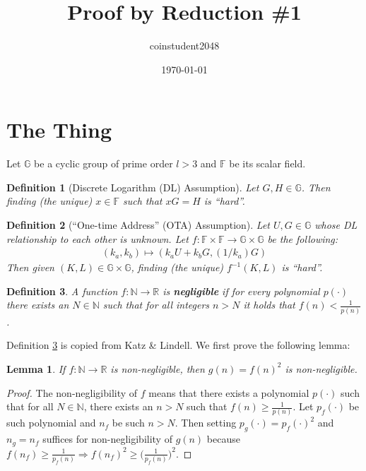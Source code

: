 \documentclass{article}
\title{Proof by Reduction \#1}
\author{coinstudent2048}
\date{\today}
\newtheorem{definition}{Definition}[section]
\newtheorem{lemma}[theorem]{Lemma}
\begin{document}
\maketitle


\section{The Thing}
\noindent Let $\mathbb{G}$ be a cyclic group of prime order $l>3$ and $\mathbb{F}$ be its scalar field.

\begin{definition}[Discrete Logarithm (DL) Assumption]
Let $G, H\in\mathbb{G}$. Then finding (the unique) $x\in\mathbb{F}$ such that $xG=H$ is ``hard''.
\end{definition}

\begin{definition}[``One-time Address'' (OTA) Assumption]
Let $U, G\in\mathbb{G}$ whose DL relationship to each other is unknown. Let $f:\mathbb{F}\times\mathbb{F}\rightarrow\mathbb{G}\times\mathbb{G}$ be the following:
\begin{align*}
    (k_a, k_b) \mapsto (k_a U + k_b G, (1/k_a)G)
\end{align*}
Then given $(K, L)\in\mathbb{G}\times\mathbb{G}$, finding (the unique) $f^{-1}(K,L)$ is ``hard''.
\end{definition}

\begin{definition}\label{negl}
A function $f:\mathbb{N}\rightarrow\mathbb{R}$ is \textbf{\em negligible} if for every polynomial $p(\cdot)$ there exists an $N\in\mathbb{N}$ such that for all integers $n>N$ it holds that $f(n)<\frac{1}{p(n)}$.
\end{definition}

\noindent Definition \ref{negl} is copied from Katz \& Lindell. We first prove the following lemma:

\begin{lemma}\label{square}
If $f:\mathbb{N}\rightarrow\mathbb{R}$ is non-negligible, then $g(n)=f(n)^2$ is non-negligible.
\end{lemma}
\begin{proof}
The non-negligibility of $f$ means that there exists a polynomial $p(\cdot)$ such that for all $N\in\mathbb{N}$, there exists an $n>N$ such that $f(n)\ge\frac{1}{p(n)}$. Let $p_f(\cdot)$ be such polynomial and $n_f$ be such $n>N$. Then setting $p_g(\cdot)=p_f(\cdot)^2$ and $n_g=n_f$ suffices for non-negligibility of $g(n)$ because $f(n_f)\ge\frac{1}{p_f(n)}\Rightarrow f(n_f)^2\ge\big(\frac{1}{p_f(n)}\big)^2$.
\end{proof}
\end{document}
